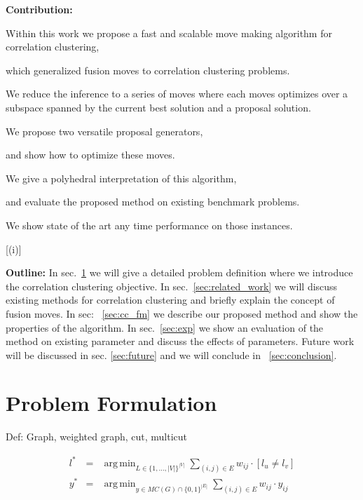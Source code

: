 \documentclass[10pt,twocolumn,letterpaper]{article}
\DeclareMathOperator*{\argmin}{arg\,min}
\begin{document}
\textbf{Contribution:}
\begin{inparaenum}[(i)]
\item Within this work we propose a fast and scalable move making algorithm for correlation clustering,
\item which generalized  fusion moves \cite{???} to correlation clustering problems.
\item We reduce the inference to a series of moves where
each moves optimizes over a subspace spanned by the current best solution
and a proposal solution.
\item We propose two versatile proposal generators,
\item and show how to optimize these moves.
\item We give a polyhedral interpretation of this algorithm,
\item and evaluate the proposed method 
on existing benchmark problems.
\item We show state of the art any time performance on those instances.
\end{inparaenum}[(i)]

\textbf{Outline:}
In sec.~\ref{sec:problem_formulation} we will give a 
detailed problem definition where we introduce 
the correlation clustering objective.
In sec.~\ref{sec:related_work} we will 
discuss existing methods for correlation 
clustering and briefly explain the concept of fusion moves.
In sec: ~\ref{sec:cc_fm} we describe our proposed
method and show the properties of the algorithm.
In sec.~\ref{sec:exp} we show an evaluation
of the method on existing parameter  and discuss the effects of parameters.
Future work will be discussed in sec. \ref{sec:future} and
we will conclude in ~\ref{sec:conclusion}.

\section{Problem Formulation}\label{sec:problem_formulation}
Def: Graph, weighted graph, cut, multicut 


\begin{center}
    \begin{eqnarray}
        l^* &=& \argmin_{L \in \{1,\ldots,|V|\}^{|V|}} \sum_{ (i,j) \in E } w_{ij} \cdot [l_{u} \neq l_{v}] \label{eq:nodeproblem}\\
        y^* &=& \argmin_{y \in MC(G)\cap \{0,1\}^{|E|}} \sum_{ (i,j) \in E } w_{ij} \cdot y_{ij} \label{eq:edgeproblem}%
    \end{eqnarray}
\end{center}
\end{document}
